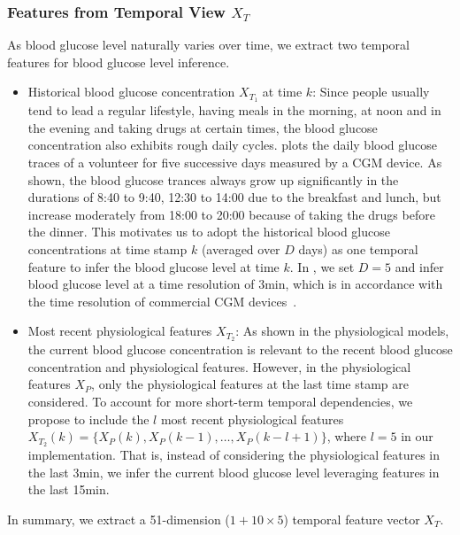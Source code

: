 \subsubsection{Features from Temporal View $X_T$}
As blood glucose level naturally varies over time, we extract two temporal features for blood glucose level inference.
\begin{itemize}
  \item
  Historical blood glucose concentration $X_{T_1}$ at time $k$:
  Since people usually tend to lead a regular lifestyle, \eg having meals in the morning, at noon and in the evening and taking drugs at certain times, the blood glucose concentration also exhibits rough daily cycles.
   plots the daily blood glucose traces of a volunteer for five successive days measured by a CGM device. As shown, the blood glucose trances always grow up significantly
  in the durations of 8:40 to 9:40, 12:30 to 14:00 due to the breakfast and lunch, but increase moderately from 18:00 to 20:00 because of taking the drugs before the dinner.
  This motivates us to adopt the historical blood glucose concentrations at time stamp $k$ (averaged over $D$ days) as one temporal feature to infer the blood glucose level at time $k$.
  In \sysname, we set $D=5$ and infer blood glucose level at a time resolution of 3min, which is in accordance with the time resolution of commercial CGM devices~\cite{bib:CGM_wave}.
  \item
  Most recent physiological features $X_{T_2}$:
  As shown in the physiological models, the current blood glucose concentration is relevant to the recent blood glucose concentration and physiological features.
  However, in the physiological features $X_P$, only the physiological features at the last time stamp are considered.
  To account for more short-term temporal dependencies, we propose to include the $l$ most recent physiological features $X_{T_2}(k) = \{X_P(k), X_P(k-1), \ldots, X_P(k-l+1)\}$, where $l=5$ in our implementation.
  That is, instead of considering the physiological features in the last 3min, we infer the current blood glucose level leveraging features in the last 15min.
\end{itemize}

In summary, we extract a 51-dimension ($1+10\times 5$) temporal feature vector $X_T$.

